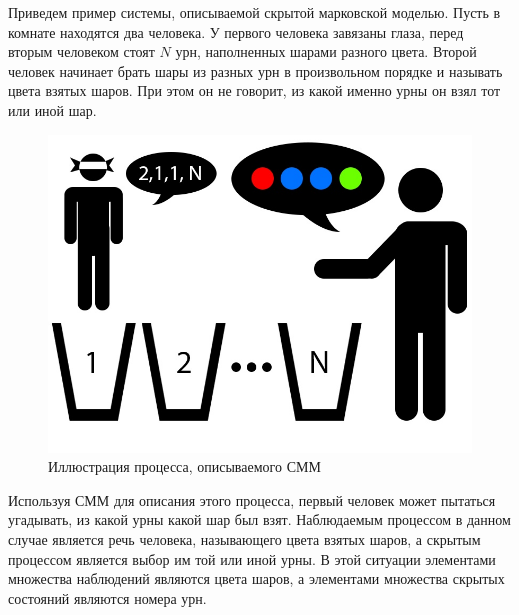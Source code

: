Приведем пример системы, описываемой скрытой марковской моделью. Пусть в комнате находятся два человека. У первого человека завязаны глаза, перед вторым человеком стоят \(N\) урн, наполненных шарами разного цвета. Второй человек начинает брать шары из разных урн в произвольном порядке и называть цвета взятых шаров. При этом он не говорит, из какой именно урны он взял тот или иной шар. 
\begin{figure}[H]
	\centering
	\includegraphics[scale=0.7]{img/hmm.jpg}
	\caption{Иллюстрация процесса, описываемого СММ}
\end{figure}
Используя СММ для описания этого процесса, первый человек может пытаться угадывать, из какой урны какой шар был взят. Наблюдаемым процессом в данном случае является речь человека, называющего цвета взятых шаров, а скрытым процессом является выбор им той или иной урны. В этой ситуации элементами множества наблюдений являются цвета шаров, а элементами множества скрытых состояний являются номера урн.

